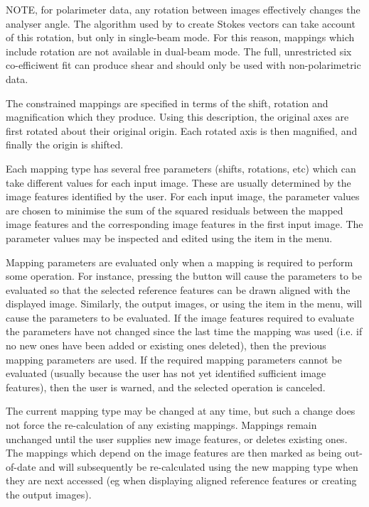 \documentclass[11pt,nolof]{starlink}
\begin{document}
NOTE, for polarimeter data, any rotation between images
effectively changes the analyser angle. The algorithm used by
 to create Stokes vectors can take account
of this rotation, but only in single-beam mode. For this reason, mappings
which include rotation are not available in dual-beam mode. The full,
unrestricted six co-efficiwent fit can produce shear and should only
be used with non-polarimetric data.

The constrained mappings are specified in terms of the shift, rotation and
magnification which they produce. Using this description, the original
axes are first rotated about their original origin. Each rotated axis is
then magnified, and finally the origin is shifted.

Each mapping type has several free parameters (shifts, rotations, etc)
which can take different values for each input image. These are usually
determined by the image features identified by the user. For each input
image, the parameter values are chosen to minimise the sum of the squared
residuals between the mapped image features and the corresponding image
features in the first input image. The parameter values may be inspected
and edited using the  item
in the  menu.

Mapping parameters are evaluated only when a mapping is required to
perform some operation. For instance, pressing the  button will cause the parameters to be
evaluated so that the selected reference features can be drawn
aligned with the displayed image. Similarly, 
the output images, or using the 
item in the  menu, will cause the
parameters to be evaluated. If the image features required to evaluate
the parameters have not changed since the last time the mapping was used
(i.e. if no new ones have been added or existing ones deleted), then the
previous mapping parameters are used. If the required mapping parameters
cannot be evaluated (usually because the user has not yet identified
sufficient image features), then the user is warned, and the selected
operation is canceled.

The current mapping type may be changed at any time, but such a change
does not force the re-calculation of any existing mappings. Mappings
remain unchanged until the user supplies new image features, or deletes
existing ones. The mappings which depend on the image features are then
marked as being out-of-date and will subsequently be re-calculated using
the new mapping type when they are next accessed (eg when displaying
aligned reference features or creating the output images).
\end{document}
